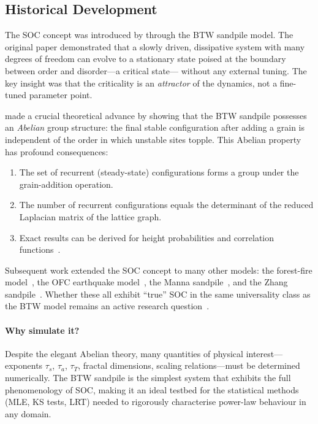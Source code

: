 \documentclass[preprint,12pt]{elsarticle}
\begin{document}
\subsection{Historical Development}

The SOC concept was introduced by \citet{Bak1987} through the BTW
sandpile model.
The original paper demonstrated that a slowly driven, dissipative
system with many degrees of freedom can evolve to a stationary state
poised at the boundary between order and disorder---a critical state---
without any external tuning.
The key insight was that the criticality is an \emph{attractor} of
the dynamics, not a fine-tuned parameter point.

\citet{Dhar1990} made a crucial theoretical advance by showing that the
BTW sandpile possesses an \emph{Abelian} group structure: the final
stable configuration after adding a grain is independent of the order
in which unstable sites topple.
This Abelian property has profound consequences:
\begin{enumerate}
  \item The set of recurrent (steady-state) configurations forms a group
        under the grain-addition operation.
  \item The number of recurrent configurations equals the determinant of
        the reduced Laplacian matrix of the lattice graph.
  \item Exact results can be derived for height probabilities and
        correlation functions~\cite{Priezzhev1996,Majumdar1992}.
\end{enumerate}

Subsequent work extended the SOC concept to many other models:
the forest-fire model~\cite{Drossel1992}, the OFC earthquake
model~\cite{OlamiEQ1992}, the Manna sandpile~\cite{Manna1991},
and the Zhang sandpile~\cite{Zhang1989}.
Whether these all exhibit ``true'' SOC in the same universality class
as the BTW model remains an active research question~\cite{Lubeck2004}.

\paragraph{Why simulate it?}
Despite the elegant Abelian theory, many quantities of physical
interest---exponents $\tau_s$, $\tau_a$, $\tau_T$, fractal dimensions,
scaling relations---must be determined numerically.
The BTW sandpile is the simplest system that exhibits the full
phenomenology of SOC, making it an ideal testbed for the statistical
methods (MLE, KS tests, LRT) needed to rigorously characterise
power-law behaviour in any domain.
\end{document}
